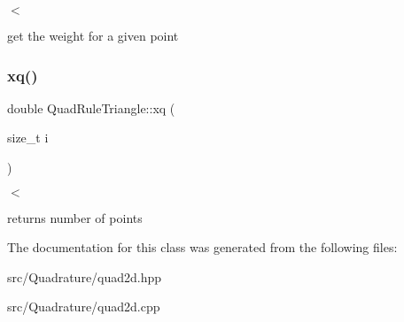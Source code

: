$<$ 

get the weight for a given point \mbox{\label{classHCore2D_1_1QuadRuleTriangle_a98156eda410a5aa6f9787ce920358fca}} 
\subsubsection{\texorpdfstring{xq()}{xq()}}
{\footnotesize\ttfamily double Quad\+Rule\+Triangle\+::xq (\begin{DoxyParamCaption}\item[{size\+\_\+t}]{i }\end{DoxyParamCaption})}



$<$ 

returns number of points 

The documentation for this class was generated from the following files\+:\begin{DoxyCompactItemize}
\item 
src/\+Quadrature/quad2d.\+hpp\item 
src/\+Quadrature/quad2d.\+cpp\end{DoxyCompactItemize}

